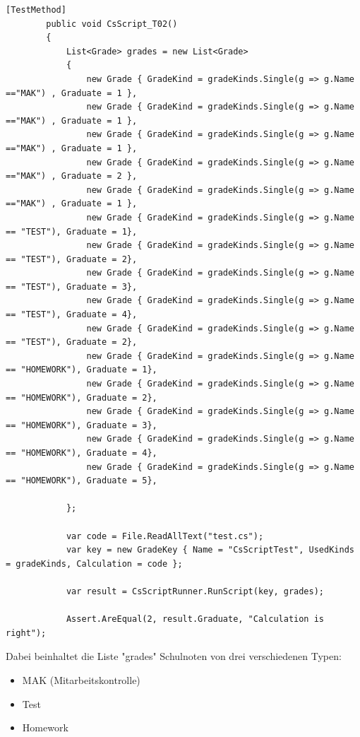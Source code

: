 \begin{lstlisting}[language={[Sharp]C},caption=Test for CsharpScripting,label=lst:impl:csc]
    [TestMethod]
        public void CsScript_T02()
        {
            List<Grade> grades = new List<Grade>
            {
                new Grade { GradeKind = gradeKinds.Single(g => g.Name =="MAK") , Graduate = 1 },
                new Grade { GradeKind = gradeKinds.Single(g => g.Name =="MAK") , Graduate = 1 },
                new Grade { GradeKind = gradeKinds.Single(g => g.Name =="MAK") , Graduate = 1 },
                new Grade { GradeKind = gradeKinds.Single(g => g.Name =="MAK") , Graduate = 2 },
                new Grade { GradeKind = gradeKinds.Single(g => g.Name =="MAK") , Graduate = 1 },
                new Grade { GradeKind = gradeKinds.Single(g => g.Name == "TEST"), Graduate = 1},
                new Grade { GradeKind = gradeKinds.Single(g => g.Name == "TEST"), Graduate = 2},
                new Grade { GradeKind = gradeKinds.Single(g => g.Name == "TEST"), Graduate = 3},
                new Grade { GradeKind = gradeKinds.Single(g => g.Name == "TEST"), Graduate = 4},
                new Grade { GradeKind = gradeKinds.Single(g => g.Name == "TEST"), Graduate = 2},
                new Grade { GradeKind = gradeKinds.Single(g => g.Name == "HOMEWORK"), Graduate = 1},
                new Grade { GradeKind = gradeKinds.Single(g => g.Name == "HOMEWORK"), Graduate = 2},
                new Grade { GradeKind = gradeKinds.Single(g => g.Name == "HOMEWORK"), Graduate = 3},
                new Grade { GradeKind = gradeKinds.Single(g => g.Name == "HOMEWORK"), Graduate = 4},
                new Grade { GradeKind = gradeKinds.Single(g => g.Name == "HOMEWORK"), Graduate = 5},

            };

            var code = File.ReadAllText("test.cs");
            var key = new GradeKey { Name = "CsScriptTest", UsedKinds = gradeKinds, Calculation = code };

            var result = CsScriptRunner.RunScript(key, grades);

            Assert.AreEqual(2, result.Graduate, "Calculation is right");
\end{lstlisting}

Dabei beinhaltet die Liste "grades" Schulnoten von drei verschiedenen Typen:
\begin{itemize}
    \item MAK (Mitarbeitskontrolle)
    \item Test
    \item Homework
\end{itemize}


